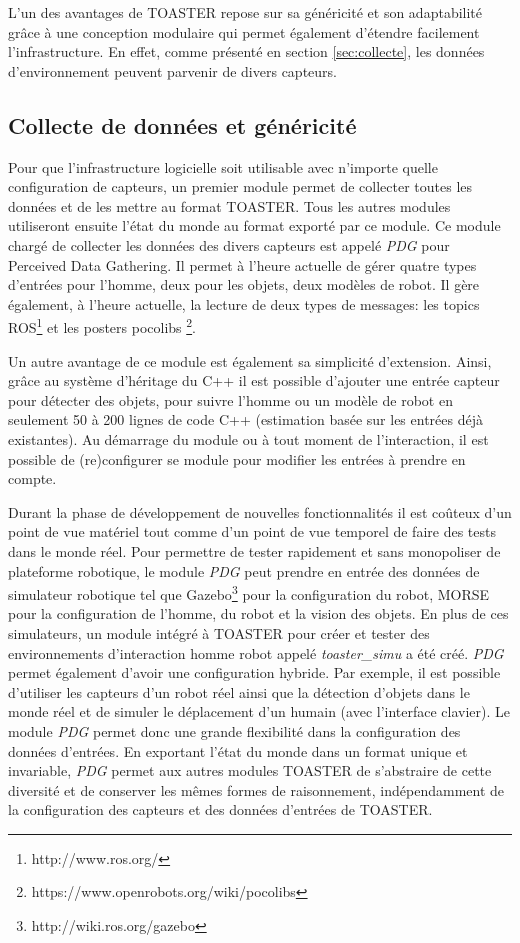 \documentclass[a4paper,11pt,twoside]{StyleThese}
\begin{document}
L'un des avantages de TOASTER repose sur sa généricité et son adaptabilité grâce à une conception modulaire qui permet également d'étendre facilement l'infrastructure. En effet, comme présenté en section \ref{sec:collecte}, les données d'environnement peuvent parvenir de divers capteurs.

\subsection{Collecte de données et généricité}
\label{sec:PDG}
Pour que l'infrastructure logicielle soit utilisable avec n'importe quelle configuration de capteurs, un premier module permet de collecter toutes les données et de les mettre au format TOASTER. Tous les autres modules utiliseront ensuite l'état du monde au format exporté par ce module. Ce module chargé de collecter les données des divers capteurs est appelé \textit{PDG} pour Perceived Data Gathering.
Il permet à l'heure actuelle de gérer quatre types d'entrées pour l'homme, deux pour les objets, deux modèles de robot. Il gère également, à l'heure actuelle, la lecture de deux types de messages: les topics ROS\footnote{http://www.ros.org/} et les posters pocolibs \footnote{https://www.openrobots.org/wiki/pocolibs}.

Un autre avantage de ce module est également sa simplicité d'extension. Ainsi, grâce au système d'héritage du C++ il est possible d'ajouter une entrée capteur pour détecter des objets, pour suivre l'homme ou un modèle de robot en seulement 50 à 200 lignes de code C++ (estimation basée sur les entrées déjà existantes).
Au démarrage du module ou à tout moment de l'interaction, il est possible de (re)configurer se module pour modifier les entrées à prendre en compte.

Durant la phase de développement de nouvelles fonctionnalités il est coûteux d'un point de vue matériel tout comme d'un point de vue temporel de faire des tests dans le monde réel. Pour permettre de tester rapidement et sans monopoliser de plateforme robotique, le module \textit{PDG} peut prendre en entrée des données de simulateur robotique tel que Gazebo\footnote{http://wiki.ros.org/gazebo} pour la configuration du robot, MORSE\cite{echeverria11} pour la configuration de l'homme, du robot et la vision des objets. En plus de ces simulateurs, un module intégré à TOASTER pour créer et tester des environnements d'interaction homme robot appelé \textit{toaster\_simu} a été créé. \textit{PDG} permet également d'avoir une configuration hybride.
Par exemple, il est possible d'utiliser les capteurs d'un robot réel ainsi que la détection d'objets dans le monde réel et de simuler le déplacement d'un humain (avec l'interface clavier).
Le module \textit{PDG} permet donc une grande flexibilité dans la configuration des données d'entrées. En exportant l'état du monde dans un format unique et invariable, \textit{PDG} permet aux autres modules TOASTER de s'abstraire de cette diversité et de conserver les mêmes formes de raisonnement, indépendamment de la configuration des capteurs et des données d'entrées de TOASTER.
\end{document}
